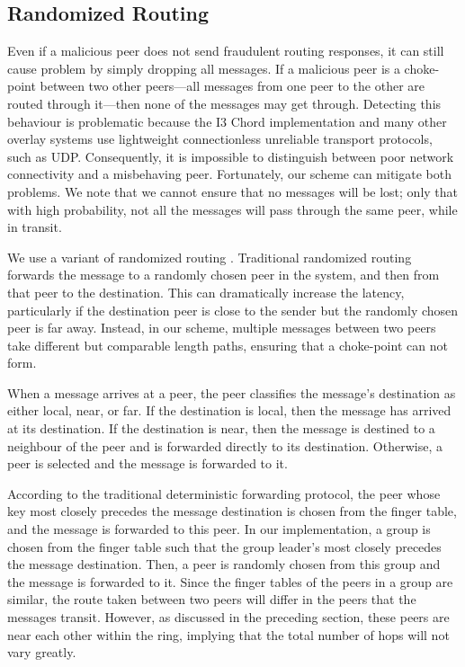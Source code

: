 \documentclass[11pt]{article}
\begin{document}
\subsection{Randomized Routing}
Even if a malicious peer does not send fraudulent routing responses,
it can still cause problem by simply dropping all messages.  If a
malicious peer is a choke-point between two other peers---all
messages from one peer to the other are routed through it---then
none of the messages may get through.  Detecting this behaviour is
problematic because the I3 Chord implementation and many other
overlay systems use lightweight connectionless unreliable transport
protocols, such as UDP.  Consequently, it is impossible to distinguish
between poor network connectivity and a misbehaving peer.  Fortunately,
our scheme can mitigate both problems.  We note that we cannot
ensure that no messages will be lost; only that with high probability,
not all the messages will pass through the same peer, while in
transit.

We use a variant of randomized routing \cite{LeMaRaRa94}.  Traditional
randomized routing forwards the message to a randomly chosen peer
in the system, and then from that peer to the destination.  This
can dramatically increase the latency, particularly if the destination
peer is close to the sender but the randomly chosen peer is far
away.  Instead, in our scheme, multiple messages between two peers
take different but comparable length paths, ensuring that a
choke-point can not form.

When a message arrives at a peer, the peer classifies the message's
destination as either local, near, or far.  If the destination is
local, then the message has arrived at its destination.  If the
destination is near, then the message is destined to a neighbour
of the peer and is forwarded directly to its destination.  Otherwise,
a peer is selected and the message is forwarded to it.

According to the traditional deterministic forwarding protocol, the
peer whose key most closely precedes the message destination is
chosen from the finger table, and the message is forwarded to this
peer.  In our implementation, a group is chosen from the finger table
such that the group leader's most closely precedes the message
destination.  Then, a peer is randomly chosen from this group and
the message is forwarded to it.  Since the finger tables of the
peers in a group are similar, the route taken between two peers
will differ in the peers that the messages transit.  However, as
discussed in the preceding section, these peers are near each other
within the ring, implying that the total number of hops will not
vary greatly.
\end{document}
